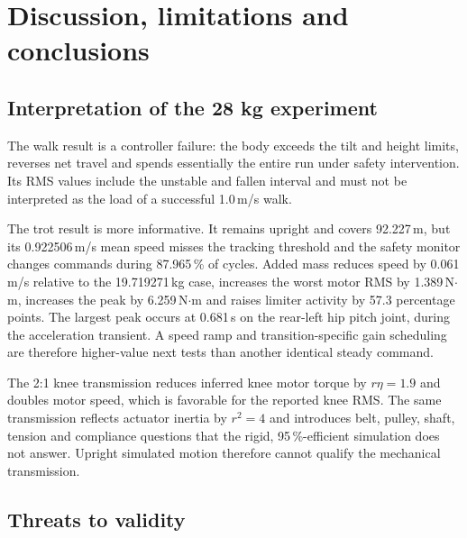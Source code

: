 \documentclass[11pt,a4paper]{article}
\begin{document}
\section{Discussion, limitations and conclusions}

\subsection{Interpretation of the 28 kg experiment}

The walk result is a controller failure: the body exceeds the tilt and height
limits, reverses net travel and spends essentially the entire run under safety
intervention. Its RMS values include the unstable and fallen interval and must
not be interpreted as the load of a successful 1.0\,m/s walk.

The trot result is more informative. It remains upright and covers 92.227\,m,
but its 0.922506\,m/s mean speed misses the tracking threshold and the safety
monitor changes commands during 87.965\,\% of cycles. Added mass reduces speed
by 0.061\,m/s relative to the 19.719271\,kg case, increases the worst motor RMS
by 1.389\,N$\cdot$m, increases the peak by 6.259\,N$\cdot$m and raises limiter
activity by 57.3 percentage points. The largest peak occurs at 0.681\,s on the
rear-left hip pitch joint, during the acceleration transient. A speed ramp and
transition-specific gain scheduling are therefore higher-value next tests than
another identical steady command.

The 2:1 knee transmission reduces inferred knee motor torque by $r\eta=1.9$
and doubles motor speed, which is favorable for the reported knee RMS. The
same transmission reflects actuator inertia by $r^2=4$ and introduces belt,
pulley, shaft, tension and compliance questions that the rigid, 95\,\%-efficient
simulation does not answer. Upright simulated motion therefore cannot qualify
the mechanical transmission.

\subsection{Threats to validity}
\end{document}
